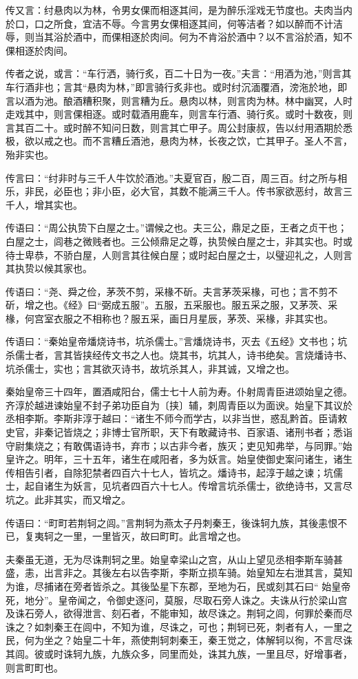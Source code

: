\documentclass[]{article}
\begin{document}
传又言：纣悬肉以为林，令男女倮而相逐其间，是为醉乐淫戏无节度也。夫肉当内於口，口之所食，宜洁不辱。今言男女倮相逐其间，何等洁者？如以醉而不计洁辱，则当其浴於酒中，而倮相逐於肉间。何为不肯浴於酒中？以不言浴於酒，知不倮相逐於肉间。

传者之说，或言：``车行洒，骑行炙，百二十日为一夜。''夫言：``用酒为池，''则言其车行酒非也；言其``悬肉为林，''即言骑行炙非也。或时纣沉湎覆酒，滂沲於地，即言以酒为池。酿酒糟积聚，则言糟为丘。悬肉以林，则言肉为林。林中幽冥，人时走戏其中，则言倮相逐。或时载酒用鹿车，则言车行酒、骑行炙。或时十数夜，则言其百二十。或时醉不知问日数，则言其亡甲子。周公封康叔，告以纣用酒期於悉极，欲以戒之也。而不言糟丘酒池，悬肉为林，长夜之饮，亡其甲子。圣人不言，殆非实也。

传言曰：``纣非时与三千人牛饮於酒池。''夫夏官百，殷二百，周三百。纣之所与相乐，非民，必臣也；非小臣，必大官，其数不能满三千人。传书家欲恶纣，故言三千人，增其实也。

传语曰：``周公执贽下白屋之士。''谓候之也。夫三公，鼎足之臣，王者之贞干也；白屋之士，闾巷之微贱者也。三公倾鼎足之尊，执贽候白屋之士，非其实也。时或待士卑恭，不骄白屋，人则言其往候白屋；或时起白屋之士，以璧迎礼之，人则言其执贽以候其家也。

传语曰：``尧、舜之俭，茅茨不剪，采椽不斫。夫言茅茨采椽，可也；言不剪不斫，增之也。《经》曰``弼成五服''。五服，五采服也。服五采之服，又茅茨、采椽，何宫室衣服之不相称也？服五采，画日月星辰，茅茨、采椽，非其实也。

传语曰：``秦始皇帝燔烧诗书，坑杀儒士。''言燔烧诗书，灭去《五经》文书也；坑杀儒士者，言其皆挟经传文书之人也。烧其书，坑其人，诗书绝矣。言烧燔诗书、坑杀儒士，实也；言其欲灭诗书，故坑杀其人，非其诚，又增之也。

秦始皇帝三十四年，置酒咸阳台，儒士七十人前为寿。仆射周青臣进颂始皇之德。齐淳於越进谏始皇不封子弟功臣自为〔挟〕辅，刺周青臣以为面谀。始皇下其议於丞相李斯。李斯非淳于越曰：``诸生不师今而学古，以非当世，惑乱黔首。臣请敕史官，非秦记皆烧之；非博士官所职，天下有敢藏诗书、百家语、诸刑书者；悉诣守尉集烧之；有敢偶语诗书，弃市；以古非今者，族灭；吏见知弗举，与同罪。''始皇许之。明年，三十五年，诸生在咸阳者，多为妖言。始皇使御史案问诸生，诸生传相告引者，自除犯禁者四百六十七人，皆坑之。燔诗书，起淳于越之谏；坑儒士，起自诸生为妖言，见坑者四百六十七人。传增言坑杀儒士，欲绝诗书，又言尽坑之。此非其实，而又增之。

传语曰：``町町若荆轲之闾。''言荆轲为燕太子丹刺秦王，後诛轲九族，其後恚恨不已，复夷轲之一里，一里皆灭，故曰町町。此言增之也。

夫秦虽无道，无为尽诛荆轲之里。始皇幸梁山之宫，从山上望见丞相李斯车骑甚盛，恚，出言非之。其後左右以告李斯，李斯立损车骑。始皇知左右泄其言，莫知为谁，尽捕诸在旁者皆杀之。其後坠星下东郡，至地为石，民或刻其石曰``
始皇帝死，地分''。皇帝闻之，令御史逐问，莫服，尽取石旁人诛之。夫诛从行於梁山宫及诛石旁人，欲得泄言、刻石者，不能审知，故尽诛之。荆轲之闾，何罪於秦而尽诛之？如刺秦王在闾中，不知为谁，尽诛之，可也；荆轲已死，刺者有人，一里之民，何为坐之？始皇二十年，燕使荆轲刺秦王，秦王觉之，体解轲以徇，不言尽诛其闾。彼或时诛轲九族，九族众多，同里而处，诛其九族，一里且尽，好增事者，则言町町也。
\end{document}
